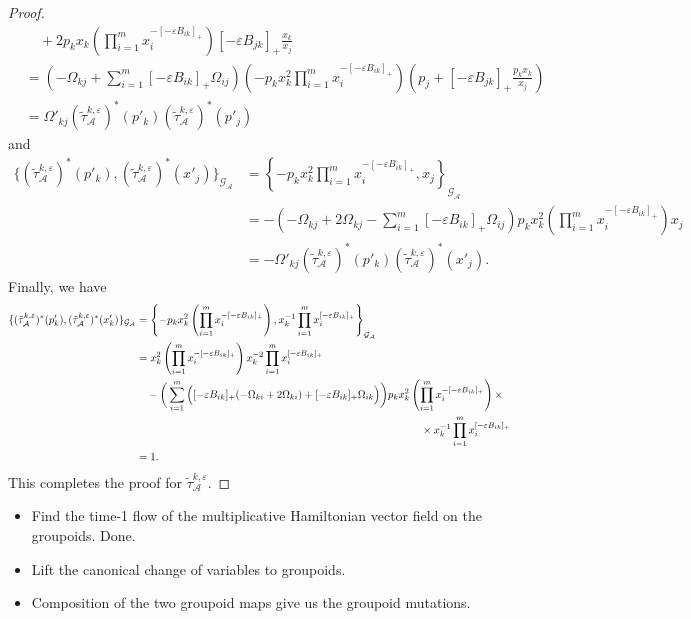 \documentclass{amsart}
\numberwithin{equation}{section}
\newcommand{\cA}{\mathcal{A}}
\newcommand{\cG}{\mathcal{G}}
\begin{document}
\begin{proof}
\begin{align*}
    &\quad + 2 p_k x_k \left(\prod\limits_{i=1}^m x_i^{-[-\varepsilon B_{ik}]_+}\right) [-\varepsilon B_{jk}]_+ \frac{x_k}{x_j}\\
    &=(-\Omega_{kj} + \sum\limits_{i=1}^m [-\varepsilon B_{ik}]_+ \Omega_{ij}) (-p_k x_k^2 \prod\limits_{i=1}^m x_i^{-[-\varepsilon B_{ik}]_+}) (p_j + [-\varepsilon B_{jk}]_+ \frac{p_k x_k}{x_j})\\
    &=\Omega'_{kj}(\tilde\tau_\cA^{k,\varepsilon})^*(p'_k) (\tilde\tau_\cA^{k,\varepsilon})^*(p'_j)
  \end{align*}
  and
  \begin{align*}
    \{(\tilde\tau_\cA^{k,\varepsilon})^*(p'_k),(\tilde\tau_\cA^{k,\varepsilon})^*(x'_j)\}_{\cG_\cA}
    &=\left\{-p_k x_k^2 \prod\limits_{i=1}^m x_i^{-[-\varepsilon B_{ik}]_+},x_j\right\}_{\cG_\cA}\\
    &= -(-\Omega_{kj} + 2\Omega_{kj} - \sum\limits_{i=1}^m [-\varepsilon B_{ik}]_+ \Omega_{ij}) p_k x_k^2\left(\prod\limits_{i=1}^m x_i^{-[-\varepsilon B_{ik}]_+}\right)x_j\\
    &= -\Omega'_{kj}(\tilde\tau_\cA^{k,\varepsilon})^*(p'_k) (\tilde\tau_\cA^{k,\varepsilon})^*(x'_j).
  \end{align*}
  Finally, we have
  \begin{align*}
    \{(\tilde\tau_\cA^{k,\varepsilon})^*(p'_k),(\tilde\tau_\cA^{k,\varepsilon})^*(x'_k)\}_{\cG_\cA}
    &=\left\{-p_k x_k^2\left(\prod\limits_{i=1}^m x_i^{-[-\varepsilon B_{ik}]_+}\right),x_k^{-1}\prod\limits_{i=1}^m x_i^{[-\varepsilon B_{ik}]_+}\right\}_{\cG_\cA}\\
    &=x_k^2\left(\prod\limits_{i=1}^m x_i^{-[-\varepsilon B_{ik}]_+}\right)x_k^{-2}\prod\limits_{i=1}^m x_i^{[-\varepsilon B_{ik}]_+}\\
    &\quad -\bigg(\sum\limits_{i=1}^m \Big([-\varepsilon B_{ik}]_+ (-\Omega_{ki} + 2\Omega_{ki}) + [-\varepsilon B_{ik}]_+ \Omega_{ik}\Big) \bigg) p_k x_k^2 \left(\prod\limits_{i=1}^m x_i^{-[-\varepsilon B_{ik}]_+}\right)\times\\
    &\hspace{3.7in}\times x_k^{-1}\prod\limits_{i=1}^m x_i^{[-\varepsilon B_{ik}]_+}\\
    &=1.
  \end{align*}
  This completes the proof for $\tilde\tau_\cA^{k,\varepsilon}$.
\end{proof}
\newpage

\begin{itemize}
\item Find the time-1 flow of the multiplicative Hamiltonian vector field on the groupoids.  Done.
\item Lift the canonical change of variables to groupoids.
\item Composition of the two groupoid maps give us the groupoid mutations.
\end{itemize}
\end{document}
